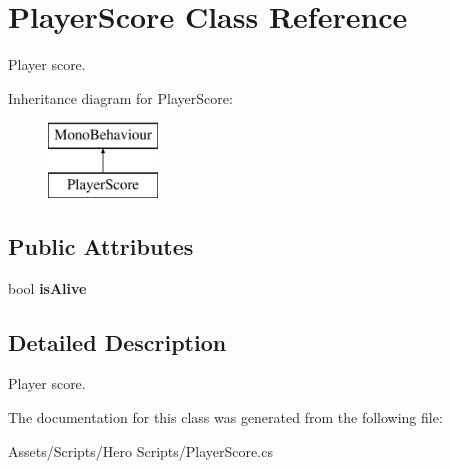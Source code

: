 \hypertarget{class_player_score}{}\section{Player\+Score Class Reference}
\label{class_player_score}


Player score.  


Inheritance diagram for Player\+Score\+:\begin{figure}[H]
\begin{center}
\leavevmode
\includegraphics[height=2.000000cm]{class_player_score}
\end{center}
\end{figure}
\subsection*{Public Attributes}
\begin{DoxyCompactItemize}
\item 
\mbox{\label{class_player_score_a571943554bd81ef392e8eb0a1504e94b}} 
bool {\bfseries is\+Alive}
\end{DoxyCompactItemize}


\subsection{Detailed Description}
Player score. 



The documentation for this class was generated from the following file\+:\begin{DoxyCompactItemize}
\item 
Assets/\+Scripts/\+Hero Scripts/Player\+Score.\+cs\end{DoxyCompactItemize}
